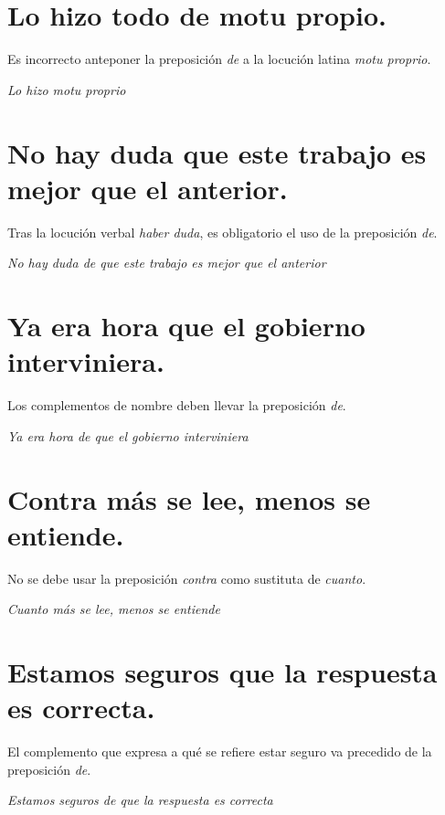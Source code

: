 \documentclass[12pt, a4paper, oneside]{report}
\begin{document}
        \section{Lo hizo todo \color{rojo}de motu propio\color{negro}.}
        Es incorrecto anteponer la preposición \emph{de} a la locución latina \emph{motu proprio}.
        \begin{center}
            \textit{Lo hizo \color{verde}motu proprio\color{negro}}
        \end{center}

        \section{No hay duda \color{rojo}que\color{negro} \;este trabajo es mejor que el anterior.}
        Tras la locución verbal \emph{haber duda}, es obligatorio el uso de la preposición \emph{de}.
        \begin{center}
            \textit{No hay duda \color{verde}de que\color{negro} \;este trabajo es mejor que el anterior}
        \end{center}

        \section{Ya era hora \color{rojo}que\color{negro} \;el gobierno interviniera.}
        Los complementos de nombre deben llevar la preposición \emph{de}.
        \begin{center}
            \textit{Ya era hora \color{verde}de que\color{negro} \;el gobierno interviniera}
        \end{center}

        \section{\color{rojo}Contra\color{negro} \;más se lee, menos se entiende.}
        No se debe usar la preposición \emph{contra} como sustituta de \emph{cuanto}.
        \begin{center}
            \textit{\color{verde}Cuanto\color{negro} \;más se lee, menos se entiende}
        \end{center}
        \clearpage

        \setcounter{chapter}{3}
        \setcounter{section}{0}

        \section{Estamos seguros \color{rojo}que\color{negro} \;la respuesta es correcta.}
        El complemento que expresa a qué se refiere estar seguro va precedido de la preposición \emph{de}.
        \begin{center}
            \textit{Estamos seguros \color{verde}de que\color{negro} \;la respuesta es correcta}
        \end{center}
\end{document}
